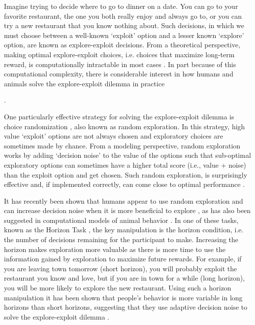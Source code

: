 \documentclass[12pt]{article}
\begin{document}
	Imagine trying to decide where to go to dinner on a date. You can go to your favorite restaurant, the one you both really enjoy and always go to, or you can try a new restaurant that you know nothing about. Such decisions, in which we must choose between a well-known `exploit' option and a lesser known `explore' option, are known as explore-exploit decisions.  From a theoretical perspective, making optimal explore-exploit choices, i.e. choices that maximize long-term reward, is computationally intractable in most cases \citep{eegittins74, eeBasu18}. In part because of this computational complexity, there is considerable interest in how humans and animals solve the explore-exploit dilemma in practice {\citep{Mehlhorn15, SCHULZ20197,WILSON202149}.
	
	One particularly effective strategy for solving the explore-exploit dilemma is choice randomization \citep{eethompson33, eewatkins89, eebridle90}, also known as random exploration. In this strategy, high value `exploit' options are not always chosen and exploratory choices are sometimes made by chance. From a modeling perspective, random exploration works by adding `decision noise' to the value of the options such that sub-optimal exploratory options can sometimes have a higher total score (i.e., value + noise) than the exploit option and get chosen. Such random exploration, is surprisingly effective and, if implemented correctly, can come close to optimal performance \citep{eethompson33, eebridle90, eeAgrawal11, eeChapelle11}.
	
	It has recently been shown that humans appear to use random exploration and can increase decision noise when it is more beneficial to explore \citep{Gershman2018, wilson2014}, as has also been suggested in computational models of animal behavior \citep{DOYA2002495, KHAMASSI2013441}. In one of these tasks, known as the Horizon Task \citep{wilson2014}, the key manipulation is the horizon condition, i.e. the number of decisions remaining for the participant to make. Increasing the horizon makes exploration more valuable as there is more time to use the information gained by exploration to maximize future rewards. For example, if you are leaving town tomorrow (short horizon), you will probably exploit the restaurant you know and love, but if you are in town for a while (long horizon), you will be more likely to explore the new restaurant. Using such a horizon manipulation it has been shown that people's behavior is more variable in long horizons than short horizons, suggesting that they use adaptive decision noise to solve the explore-exploit dilemma \citep{wilson2014}. 

}
\end{document}
